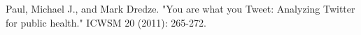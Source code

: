 \documentclass[12pt]{article}
\begin{document}
\begin{thebibliography}{99}
 Paul, Michael J., and Mark Dredze. "You are what you Tweet: Analyzing Twitter for public health." ICWSM 20 (2011): 265-272.

\end{thebibliography}






\end{document}
